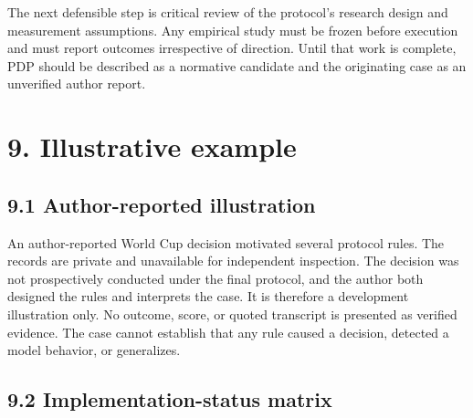 \documentclass[
  english,
]{article}
\begin{document}
The next defensible step is critical review of the protocol's research
design and measurement assumptions. Any empirical study must be frozen
before execution and must report outcomes irrespective of direction.
Until that work is complete, PDP should be described as a normative
candidate and the originating case as an unverified author report.

\section{9. Illustrative example}\label{illustrative-example}

\subsection{9.1 Author-reported
illustration}\label{author-reported-illustration}

An author-reported World Cup decision motivated several protocol rules.
The records are private and unavailable for independent inspection. The
decision was not prospectively conducted under the final protocol, and
the author both designed the rules and interprets the case. It is
therefore a development illustration only. No outcome, score, or quoted
transcript is presented as verified evidence. The case cannot establish
that any rule caused a decision, detected a model behavior, or
generalizes.

\subsection{9.2 Implementation-status
matrix}\label{implementation-status-matrix-1}
\end{document}
